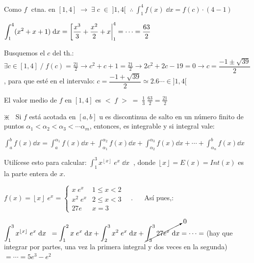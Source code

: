 \begin{proofw}\renewcommand{\qedsymbol}{$\diamond$}	

Como $f\; $ ctna. en $[1,4]\; \to \; \exists \; c \; \in \; ]1,4[ \;\;  \therefore  \; \displaystyle \int_1^4 f(x)\; \dd x = f(c)\cdot (4-1)\; $

$\displaystyle \int_1^4 (x^2+x+1)\; \dd x =\eval[\frac {x^3}{3}+\frac {x^2}{2}+x|_1^4 = \cdots = \frac {63}{2}$ 

Busquemos el $c$ del th.: $\exists c \in [1,4] \; / \; f(c)=\frac {21}{2} \to c^2+c+1=\frac {21}{2} \to 2c^2+2c-19=0 \to c=\dfrac {-1\pm \sqrt{39}}{2} $, para que esté en el intervalo: $c= \dfrac {-1+ \sqrt{39}}{2} \simeq 2.6\cdots \in ]1,4[ $

\vspace{2mm}El valor medio de $f$ en $[1,4]$ es $<\; f\; >\; =\; \frac 1 3\;  \frac {63}{2}= \frac {21}{2}$ 
	
\end{proofw}

\begin{ejre}$\divideontimes \; \; $ Si $f$ está acotada en $[a,b]$ u es discontinua de salto en un número finito de puntos $\alpha_1<\alpha_2<\alpha_3<\cdots\alpha_m$, entonces, es integrable y si integral vale:

$\displaystyle \int_a^b f(x) \dd x= \int_a^{\alpha_1} f(x) \dd x + \int_{\alpha_1}^{\alpha_2} f(x) \dd x+ \int_{\alpha_2}^{\alpha_3} f(x) \dd x + \cdots + \int_{\alpha_n}^b f(x) \dd x$

Utilícese esto para calcular: $\displaystyle \int_1^3 x^{\left\lfloor x \right\rfloor }\; e^x \; \dd x \; \; $, donde $\left\lfloor x \right\rfloor=E(x)=Int(x)$ es la parte entera de $x$.
	
\end{ejre}

\begin{proofw}\renewcommand{\qedsymbol}{$\diamond$}	

$f(x) = \left\lfloor x \right\rfloor \; e^x =
\begin{cases}	
 x\; e^x & 1\le x<2 \\
 x^2 \; e^x & 2\le x <3 \\
 27 e & x=3	
\end{cases}\quad$. $\quad$ Así pues,:

$\displaystyle \int_1^3 x^{\left\lfloor x \right\rfloor }\; e^x \; \dd x \; \; = \int_1^2 x\; e^x\; \dd x + \int_2^3 x^2\; e^x\; \dd x + \cancelto{0}{\int_3^3 27 e^x\; \dd x}= \cdots =$ (hay que integrar por partes, una vez la primera integral y dos veces en la segunda) $=\cdots= 5e^3-e^2$

\end{proofw}

